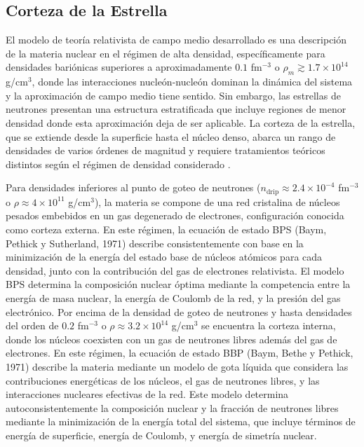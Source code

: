 \subsection{Corteza de la Estrella}

El modelo de teoría relativista de campo medio desarrollado es una descripción de la materia nuclear en el régimen de alta densidad, específicamente para densidades bariónicas superiores a aproximadamente $0.1$ fm$^{-3}$ o $\rho_m \gtrsim 1.7 \times 10^{14}$ g/cm$^3$, donde las interacciones nucleón-nucleón dominan la dinámica del sistema y la aproximación de campo medio tiene sentido. Sin embargo, las estrellas de neutrones presentan una estructura estratificada que incluye regiones de menor densidad donde esta aproximación deja de ser aplicable. La corteza de la estrella, que se extiende desde la superficie hasta el núcleo denso, abarca un rango de densidades de varios órdenes de magnitud y requiere tratamientos teóricos distintos según el régimen de densidad considerado \cite{shapiroBlackHolesWhite2008}.

Para densidades inferiores al punto de goteo de neutrones ($n_{\text{drip}} \approx 2.4\times10^{-4}$ fm$^{-3}$ o $\rho \approx 4 \times 10^{11}$ g/cm$^3$), la materia se compone de una red cristalina de núcleos pesados embebidos en un gas degenerado de electrones, configuración conocida como corteza externa. En este régimen, la ecuación de estado BPS (Baym, Pethick y Sutherland, 1971) \cite{baymGroundStateMatter1971} describe consistentemente con base en la minimización de la energía del estado base de núcleos atómicos para cada densidad, junto con la contribución del gas de electrones relativista. El modelo BPS determina la composición nuclear óptima mediante la competencia entre la energía de masa nuclear, la energía de Coulomb de la red, y la presión del gas electrónico. Por encima de la densidad de goteo de neutrones y hasta densidades del orden de $0.2$ fm$^{-3}$ o $\rho \approx 3.2 \times 10^{14}$ g/cm$^3$ se encuentra la corteza interna, donde los núcleos coexisten con un gas de neutrones libres además del gas de electrones. En este régimen, la ecuación de estado BBP (Baym, Bethe y Pethick, 1971) \cite{baymNeutronStarMatter1971} describe la materia mediante un modelo de gota líquida que considera las contribuciones energéticas de los núcleos, el gas de neutrones libres, y las interacciones nucleares efectivas de la red. Este modelo determina autoconsistentemente la composición nuclear y la fracción de neutrones libres mediante la minimización de la energía total del sistema, que incluye términos de energía de superficie, energía de Coulomb, y energía de simetría nuclear.

